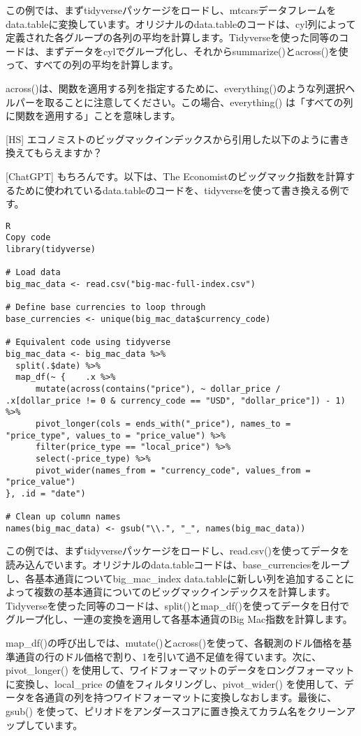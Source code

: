 \documentclass[
]{book}
\theoremstyle{definition}
\theoremstyle{definition}
\theoremstyle{definition}
\theoremstyle{definition}
\theoremstyle{remark}
\begin{document}
この例では、まずtidyverseパッケージをロードし、mtcarsデータフレームをdata.tableに変換しています。オリジナルのdata.tableのコードは、cyl列によって定義された各グループの各列の平均を計算します。Tidyverseを使った同等のコードは、まずデータをcylでグループ化し、それからsummarize()とacross()を使って、すべての列の平均を計算します。

across()は、関数を適用する列を指定するために、everything()のような列選択ヘルパーを取ることに注意してください。この場合、everything() は「すべての列に関数を適用する」ことを意味します。

{[}HS{]} エコノミストのビッグマックインデックスから引用した以下のように書き換えてもらえますか？

{[}ChatGPT{]} もちろんです。以下は、The Economistのビッグマック指数を計算するために使われているdata.tableのコードを、tidyverseを使って書き換える例です。

\begin{verbatim}
R
Copy code
library(tidyverse)

# Load data
big_mac_data <- read.csv("big-mac-full-index.csv")

# Define base currencies to loop through
base_currencies <- unique(big_mac_data$currency_code)

# Equivalent code using tidyverse
big_mac_data <- big_mac_data %>%
  split(.$date) %>%
  map_df(~ {    .x %>%
      mutate(across(contains("price"), ~ dollar_price / .x[dollar_price != 0 & currency_code == "USD", "dollar_price"]) - 1) %>%
      pivot_longer(cols = ends_with("_price"), names_to = "price_type", values_to = "price_value") %>%
      filter(price_type == "local_price") %>%
      select(-price_type) %>%
      pivot_wider(names_from = "currency_code", values_from = "price_value")
}, .id = "date")

# Clean up column names
names(big_mac_data) <- gsub("\\.", "_", names(big_mac_data))
\end{verbatim}

この例では、まずtidyverseパッケージをロードし、read.csv()を使ってデータを読み込んでいます。オリジナルのdata.tableコードは、base\_currenciesをループし、各基本通貨についてbig\_mac\_index data.tableに新しい列を追加することによって複数の基本通貨についてのビッグマックインデックスを計算します。Tidyverseを使った同等のコードは、split()とmap\_df()を使ってデータを日付でグループ化し、一連の変換を適用して各基本通貨のBig Mac指数を計算します。

map\_df()の呼び出しでは、mutate()とacross()を使って、各観測のドル価格を基準通貨の行のドル価格で割り、1を引いて過不足値を得ています。次に、pivot\_longer() を使用して、ワイドフォーマットのデータをロングフォーマットに変換し、local\_price の値をフィルタリングし、pivot\_wider() を使用して、データを各通貨の列を持つワイドフォーマットに変換しなおします。最後に、gsub() を使って、ピリオドをアンダースコアに置き換えてカラム名をクリーンアップしています。
\end{document}
